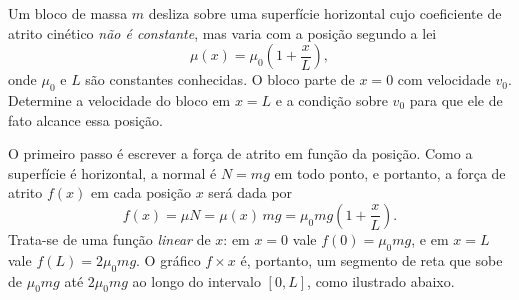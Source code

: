 \vspace{0.3cm}





\begin{exemplo}\label{exemplo_energia_teoremaenergiacinetica03}

Um bloco de massa $m$ desliza sobre uma superfície horizontal cujo
coeficiente de atrito cinético \emph{não é constante}, mas varia com a
posição segundo a lei
%
\begin{equation*}
    \mu(x) = \mu_0\!\left(1 + \frac{x}{L}\right),
\end{equation*}
%
onde $\mu_0$ e $L$ são constantes conhecidas. O bloco parte de $x = 0$
com velocidade $v_0$. Determine a velocidade do bloco em $x = L$ e a
condição sobre $v_0$ para que ele de fato alcance essa posição.

\resolucao

O primeiro passo é escrever a força de atrito em função da posição.
Como a superfície é horizontal, a normal é $N = mg$ em todo ponto, e
portanto, a força de atrito $f(x)$ em cada posição $x$ será dada por
%
\begin{equation*}
    f(x) = \mu N = \mu(x)\,mg = \mu_0 mg\!\left(1 + \frac{x}{L}\right).
\end{equation*}
%
Trata-se de uma função \emph{linear} de $x$: em $x = 0$ vale
$f(0) = \mu_0 mg$, e em $x = L$ vale $f(L) = 2\mu_0 mg$. O gráfico
$f \times x$ é, portanto, um segmento de reta que sobe de
$\mu_0 mg$ até $2\mu_0 mg$ ao longo do intervalo $[0, L]$, como
ilustrado abaixo.

\bigskip

\begin{center}
\end{center}
\end{exemplo}
